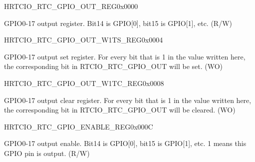 \begin{register}{H}{RTCIO\_RTC\_GPIO\_OUT\_REG}{0x0000}\label{regdesc:RTCIORTCGPIOOUTREG}
%
%
\regnewline%
\begin{regdesc}\begin{reglist}
\item [RTCIO\_RTC\_GPIO\_OUT\_DATA]GPIO0-17 output register. Bit14 is GPIO[0], bit15 is GPIO[1], etc. (R/W)
\end{reglist}\end{regdesc}
\end{register}


\begin{register}{H}{RTCIO\_RTC\_GPIO\_OUT\_W1TS\_REG}{0x0004}\label{regdesc:RTCIORTCGPIOOUTW1TSREG}
%
%
\regnewline%
\begin{regdesc}\begin{reglist}
\item [RTCIO\_RTC\_GPIO\_OUT\_DATA\_W1TS]GPIO0-17 output set register. For every bit that is 1 in the value written here, the corresponding bit in RTCIO\_RTC\_GPIO\_OUT will be set. (WO)
\end{reglist}\end{regdesc}
\end{register}


\begin{register}{H}{RTCIO\_RTC\_GPIO\_OUT\_W1TC\_REG}{0x0008}\label{regdesc:RTCIORTCGPIOOUTW1TCREG}
%
%
\regnewline%
\begin{regdesc}\begin{reglist}
\item [RTCIO\_RTC\_GPIO\_OUT\_DATA\_W1TC]GPIO0-17 output clear register. For every bit that is 1 in the value written here, the corresponding bit in RTCIO\_RTC\_GPIO\_OUT will be cleared. (WO)
\end{reglist}\end{regdesc}
\end{register}


\begin{register}{H}{RTCIO\_RTC\_GPIO\_ENABLE\_REG}{0x000C}\label{regdesc:RTCIORTCGPIOENABLEREG}
%
%
\regnewline%
\begin{regdesc}\begin{reglist}
\item [RTCIO\_RTC\_GPIO\_ENABLE]GPIO0-17 output enable. Bit14 is GPIO[0], bit15 is GPIO[1], etc. 1 means this GPIO pin is output. (R/W)
\end{reglist}\end{regdesc}
\end{register}


